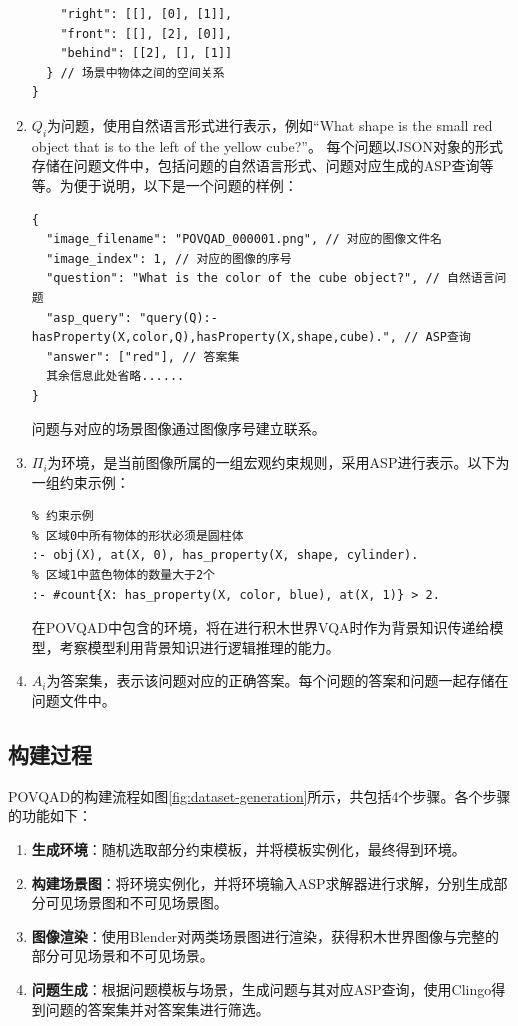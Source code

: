 \begin{enumerate}[nosep]
\begin{lstlisting}
    "right": [[], [0], [1]],
    "front": [[], [2], [0]],
    "behind": [[2], [], [1]]
  } // 场景中物体之间的空间关系
}
\end{lstlisting}
\item \textbf{$Q_i$}为问题，使用自然语言形式进行表示，例如“What shape is the small red object that is to the left of the yellow cube?”。
每个问题以JSON对象的形式存储在问题文件中，包括问题的自然语言形式、问题对应生成的ASP查询等等。为便于说明，以下是一个问题的样例：
\begin{lstlisting}
{
  "image_filename": "POVQAD_000001.png", // 对应的图像文件名
  "image_index": 1, // 对应的图像的序号
  "question": "What is the color of the cube object?", // 自然语言问题
  "asp_query": "query(Q):-hasProperty(X,color,Q),hasProperty(X,shape,cube).", // ASP查询
  "answer": ["red"], // 答案集
  其余信息此处省略......
}
\end{lstlisting}
问题与对应的场景图像通过图像序号建立联系。
\item \textbf{$\Pi_i$}为环境，是当前图像所属的一组宏观约束规则，采用ASP进行表示。以下为一组约束示例：
\begin{lstlisting}
% 约束示例
% 区域0中所有物体的形状必须是圆柱体
:- obj(X), at(X, 0), has_property(X, shape, cylinder).
% 区域1中蓝色物体的数量大于2个
:- #count{X: has_property(X, color, blue), at(X, 1)} > 2.
\end{lstlisting}
在POVQAD中包含的环境，将在进行积木世界VQA时作为背景知识传递给模型，考察模型利用背景知识进行逻辑推理的能力。
\item \textbf{$A_i$}为答案集，表示该问题对应的正确答案。每个问题的答案和问题一起存储在问题文件中。
\end{enumerate}
\subsection{构建过程}
POVQAD的构建流程如图\ref{fig:dataset-generation}所示，共包括4个步骤。各个步骤的功能如下：
\begin{enumerate}[nosep]
\item \textbf{生成环境}：随机选取部分约束模板，并将模板实例化，最终得到环境。
\item \textbf{构建场景图}：将环境实例化，并将环境输入ASP求解器进行求解，分别生成部分可见场景图和不可见场景图。
\item \textbf{图像渲染}：使用Blender对两类场景图进行渲染，获得积木世界图像与完整的部分可见场景和不可见场景。
\item \textbf{问题生成}：根据问题模板与场景，生成问题与其对应ASP查询，使用Clingo得到问题的答案集并对答案集进行筛选。
\end{enumerate}


